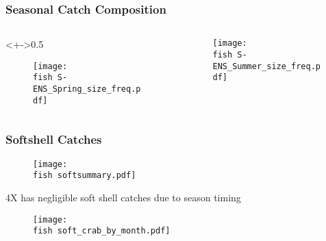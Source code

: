 \documentclass{beamer}
\newcommand{\fish}{C:/Rsaves/fishery/2017/}
\begin{document}

\begin{frame}
\frametitle{Seasonal Catch Composition}

\begin{columns}
\begin{column}<+->{0.5\textwidth}
 \vspace*{-0.5cm}
\begin{figure}
\centerline{\texttt{[image: \\fish S-ENS\_Spring\_size\_freq.pdf]}}

\end{figure}
\end{column}

\begin{column}{0.5\textwidth}
\begin{figure}
 \vspace*{-0.5cm}

\centerline{\texttt{[image: \\fish S-ENS\_Summer\_size\_freq.pdf]}}

 \end{figure}

\end{column}
\end{columns}

\end{frame}


\begin{frame}
	\frametitle{Softshell Catches}
	\begin{figure}
		
		\vspace*{-.5cm}
		\centerline{\texttt{[image: \\fish softsummary.pdf]}}
		
	\end{figure}
\*4X has negligible soft shell catches due to season timing
\end{frame}







\begin{frame}
\begin{figure}
  \centerline{\texttt{[image: \\fish soft\_crab\_by\_month.pdf]}}

 \end{figure}
\end{frame}
\end{document}
